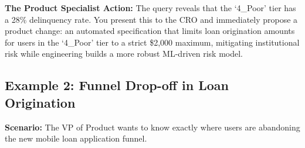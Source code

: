 \documentclass[
  11pt,
  openany,
  oneside]{book}
\begin{document}
\textbf{The Product Specialist Action:} The query reveals that the
`4\_Poor' tier has a 28\% delinquency rate. You present this to the CRO
and immediately propose a product change: an automated specification
that limits loan origination amounts for users in the `4\_Poor' tier to
a strict \$2,000 maximum, mitigating institutional risk while
engineering builds a more robust ML-driven risk model.

\subsection{Example 2: Funnel Drop-off in Loan
Origination}\label{example-2-funnel-drop-off-in-loan-origination}

\textbf{Scenario:} The VP of Product wants to know exactly where users
are abandoning the new mobile loan application funnel.
\end{document}
